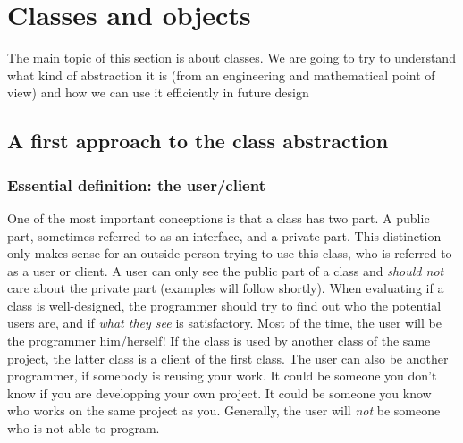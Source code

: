 \documentclass[12pt]{article}
\begin{document}
\section{Classes and objects}

The main topic of this section is about classes. We are going to try to understand what kind of abstraction it is (from an engineering and mathematical point of view) and how we can use it efficiently in future design

\subsection{A first approach to the class abstraction}
\subsubsection{Essential definition: the user/client}
One of the most important conceptions is that a class has two part. A public part, sometimes referred to as an interface, and a private part. This distinction only makes sense for an outside person trying to use this class, who is referred to as a user or client. A user can only see the public part of a class and \emph{should not} care about the private part (examples will follow shortly). When evaluating if a class is well-designed, the programmer should try to find out who the potential users are, and if \emph{what they see} is satisfactory. Most of the time, the user will be the programmer him/herself! If the class is used by another class of the same project, the latter class is a client of the first class. The user can also be another programmer, if somebody is reusing your work. It could be someone you don't know if you are developping your own project. It could be someone you know who works on the same project as you. Generally, the user will \emph{not} be someone who is not able to program.
\end{document}
